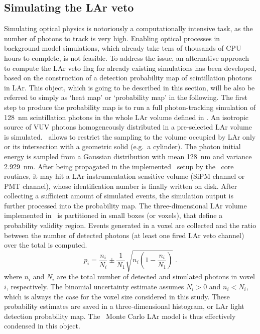 \subsection{Simulating the LAr veto}%
\label{sec:bkg:lar:ph2:heatmap}

Simulating optical physics is notoriously a computationally intensive task, as the number
of photons to track is very high. Enabling optical processes in background model
simulations, which already take tens of thousands of CPU hours to complete, is not
feasible. To address the issue, an alternative approach to compute the LAr veto flag for
already existing simulations has been developed, based on the construction of a detection
probability map of scintillation photons in LAr. This object, which is going to be
described in this section, will be also be referred to simply as `heat map' or
`probability map' in the following.
\newpar
The first step to produce the probability map is to run a full photon-tracking simulation
of 128~nm scintillation photons in the whole LAr volume defined in \mage. An isotropic
source of VUV photons homogeneously distributed in a pre-selected LAr volume is simulated.
\mage\ allows to restrict the sampling to the volume occupied by LAr only or its
intersection with a geometric solid (e.g.~a cylinder). The photon initial energy is
sampled from a Gaussian distribution with mean 128~nm and variance 2.929~nm. After being
propagated in the implemented \gerda\ setup by the \geant\ core routines, it may hit a
LAr instrumentation sensitive volume (SiPM channel or PMT channel), whose identification
number is finally written on disk. After collecting a sufficient amount of simulated
events, the simulation output is further processed into the probability map. The
three-dimensional LAr volume implemented in \mage\ is partitioned in small boxes (or voxels),
that define a probability validity region. Events generated in a voxel are collected and
the ratio between the number of detected photons (at least one fired LAr veto channel)
over the total is computed.
\[
  p_i = \frac{n_i}{N_i} \pm \frac{1}{N_1}\sqrt{n_i \left(1 - \frac{n_i}{N_1} \right)} \;.
\]
where $n_i$ and $N_i$ are the total number of detected and simulated photons in voxel $i$,
respectively. The binomial uncertainty estimate assumes $N_i>0$ and $n_i<N_i$, which is
always the case for the voxel size considered in this study.  These probability estimates
are saved in a three-dimensional histogram, or LAr light detection probability map. The
\gerda\ Monte Carlo LAr model is thus effectively condensed in this object.
